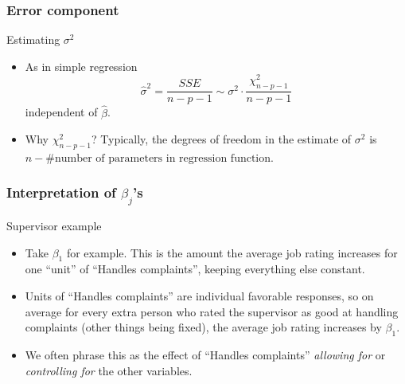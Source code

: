 \documentclass[handout]{beamer}
\begin{document}

   \begin{frame} \frametitle{Error component}

   \begin{block}
   {Estimating $\sigma^2$}
   \begin{itemize}


   \item As in simple regression
   $$
   \widehat{\sigma}^2 = \frac{SSE}{n-p-1} \sim \sigma^2 \cdot \frac{\chi^2_{n-p-1}}{n-p-1}$$
   independent of $\widehat{\beta}$.


   \item
   Why $\chi^2_{n-p-1}$?
   Typically, the degrees of freedom in the estimate of $\sigma^2$ is $n-\# \text{number of parameters in regression function}$.
   \end{itemize}
   \end{block}
   \end{frame}


   \begin{frame} \frametitle{Interpretation of $\beta_j$'s}

   \begin{block}
   {Supervisor example}
   \begin{itemize}

   \item Take $\beta_1$ for example. This is the amount the average
   job rating increases for one ``unit'' of ``Handles complaints'',
   keeping everything else constant.

   \item Units of ``Handles complaints'' are individual favorable responses, so on average
   for every extra person who rated the supervisor as good at handling complaints
   (other things being fixed), the average job rating increases by $\beta_1$.

   \item We often phrase this as the effect of ``Handles complaints'' {\em
   allowing for} or {\em controlling for} the other variables.
   \end{itemize}
   \end{block}
   \end{frame}

\end{document}
